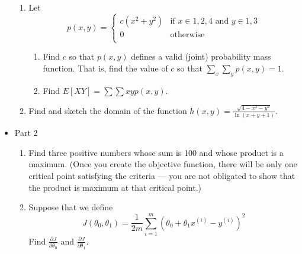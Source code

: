 \documentclass{article}
\begin{document}
\begin{itemize}
\begin{enumerate}
                    \item Let  $$p(x,y) = \begin{cases} 
                        c(x^2+y^2) & \text{if $x\in {1, 2, 4}$ and $y\in{1, 3}$} \\
                        0 & \text{otherwise} \\
                        \end{cases}
                        $$
                        \begin{enumerate}
                            \item Find $c$ so that $p(x,y)$ defines a valid (joint) probability mass function.  That is, find the value of $c$ so that $\displaystyle \sum_x \sum_y p(x, y) = 1$. 
                            \item Find $\displaystyle E[XY] =\sum\sum xyp(x,y)$.
                        \end{enumerate}
                    \item Find and sketch the domain of the function $\displaystyle h(x,y) = \frac{\sqrt{4-x^2-y^2}}{\ln(x+y+1)}$.
                \end{enumerate}
            \item Part 2
                \begin{enumerate}
                    \item Find three positive numbers whose sum is 100 and whose product is a maximum. (Once you create the objective function, there will be only one critical point satisfying the criteria --- you are not obligated to show that the product is maximum at that critical point.)
                    \item Suppose that we define
                    $$J(\theta_0, \theta_1) = \frac{1}{2m}\sum_{i=1}^m(\theta_0 + \theta_1x^{(i)} - y^{(i)})^2$$
                    Find $\displaystyle \frac{\partial J}{\partial \theta_0}$ and $\displaystyle \frac{\partial J}{\partial \theta_1}$.
                    

\end{enumerate}
\end{itemize}
\end{document}
